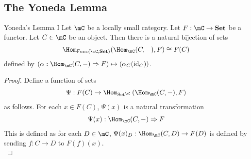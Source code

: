 \documentclass[a4paper]{article}
\begin{document}
\subsection{The Yoneda Lemma}
\begin{thm}{Yoneda's Lemma I}{} Let $\mC$ be a locally small category. Let $F:\mC\to\bold{Set}$ be a functor. Let $C\in\mC$ be an object. Then there is a natural bijection of sets $$\Hom_{\text{Func}(\mC,\bold{Set})}(\Hom_\mC(C,-),F)\cong F(C)$$ defined by $\left(\alpha:\Hom_\mC(C,-)\Rightarrow F\right)\mapsto\left(\alpha_C(\text{id}_C)\right)$. 
\begin{proof}
Define a function of sets $$\Psi:F(C)\to\Hom_{\text{Set}^\mC}\left(\Hom_\mC(C,-),F\right)$$ as follows. For each $x\in F(C)$, $\Psi(x)$ is a natural transformation $$\Psi(x):\Hom_\mC(C,-)\Rightarrow F$$ This is defined as for each $D\in\mC$, $\Psi(x)_D:\Hom_\mC(C,D)\to F(D)$ is defined by sending $f:C\to D$ to $F(f)(x)$. \\


\end{proof}
\end{thm}
\end{document}
